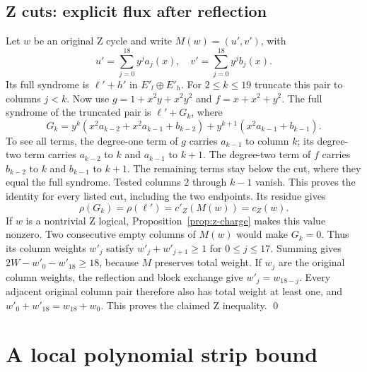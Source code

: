 \documentclass{article}
\begin{document}
\subsection{Z cuts: explicit flux after reflection}\label{sec:z-cuts}

Let \(w\) be an original Z cycle and write \(M(w)=(u',v')\), with
\begin{equation}
  u'=\sum_{j=0}^{18}y^ja_j(x), \quad
  v'=\sum_{j=0}^{18}y^jb_j(x).
\end{equation}
Its full syndrome is \(\ell'+h'\) in \(E'_l\oplus E'_h\).
For \(2\le k\le 19\) truncate this pair to columns \(j<k\).
Now use \(g=1+x^2y+x^2y^2\) and \(f=x+x^2+y^2\).
The full syndrome of the truncated pair is \(\ell'+G_k\), where
\begin{equation}
  G_k=y^k(x^2a_{k-2}+x^2a_{k-1}+b_{k-2})
  +y^{k+1}(x^2a_{k-1}+b_{k-1}).
\end{equation}
To see all terms, the degree-one term of \(g\) carries \(a_{k-1}\)
to column \(k\); its degree-two term carries \(a_{k-2}\) to \(k\)
and \(a_{k-1}\) to \(k+1\). The degree-two term of \(f\) carries
\(b_{k-2}\) to \(k\) and \(b_{k-1}\) to \(k+1\).
The remaining terms stay below the cut, where they equal the full
syndrome. Tested columns 2 through \(k-1\) vanish. This proves the
identity for every listed cut, including the two endpoints.
Its residue gives
\begin{equation}
  \rho(G_k)=\rho(\ell')=c'_Z(M(w))=c_Z(w).
\end{equation}
If \(w\) is a nontrivial Z logical, Proposition~\ref{prop:z-charge} makes this value
nonzero. Two consecutive empty columns of \(M(w)\) would make \(G_k=0\).
Thus its column weights \(w'_j\) satisfy
\(w'_j+w'_{j+1}\ge 1\) for \(0\le j\le 17\). Summing gives
\(2W-w'_0-w'_{18}\ge 18\), because \(M\) preserves total weight.
If \(w_j\) are the original column weights, the reflection and block
exchange give \(w'_j=w_{18-j}\). Every adjacent original column pair
therefore also has total weight at least one, and
\(w'_0+w'_{18}=w_{18}+w_0\). This proves the claimed Z inequality. \qed

\section{A local polynomial strip bound}\label{sec:strip}
\end{document}
